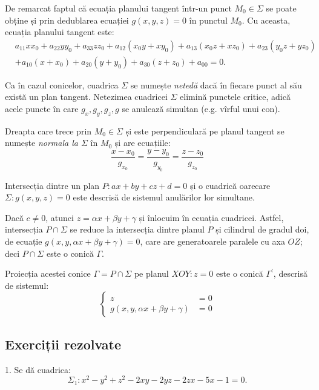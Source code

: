 \documentclass[11pt,a4paper]{article}
\theoremstyle{dotless}
\theoremstyle{dotlessdr}
\begin{document}
De remarcat faptul că ecuația planului tangent într-un punct $M_0 \in \Sigma$
se poate obține și prin dedublarea ecuației $g(x, y, z) = 0$ în punctul $M_0$.
Cu aceasta, ecuația planului tangent este:
\begin{align*}
	& a_{11} xx_0 + a_{22} yy_0 + a_{33}zz_0 + a_{12}(x_0y + xy_0) +
	    a_{13}(x_0z + xz_0) + a_{23}(y_0 z+ yz_0) \\
	&+ a_{10}(x + x_0) + a_{20}(y + y_0) + a_{30}(z + z_0) + a_{00} = 0.
\end{align*}

Ca în cazul conicelor, cuadrica $\Sigma$ se numește \emph{netedă} dacă în
fiecare punct al său există un plan tangent. Netezimea cuadricei $\Sigma$
elimină punctele critice, adică acele puncte în care $g_x, g_y, g_z, g$ se
anulează simultan (e.g. vîrful unui con).

Dreapta care trece prin $M_0 \in \Sigma$ și este perpendiculară pe planul
tangent se numește \emph{normala la $\Sigma$} în $M_0$ și are ecuațiile: 
 \[
	\dfrac{x - x_0}{g_{x_0}} = \dfrac{y - y_0}{g_{y_0}} =
	\dfrac{z - z_0}{g_{z_0}}
\]

Intersecția dintre un plan $P: ax + by + cz + d = 0$ și o cuadrică oarecare
$\Sigma: g(x, y, z) = 0$ este descrisă de sistemul anulărilor lor simultane.

Dacă $c \neq 0$, atunci $z = \alpha x + \beta y + \gamma$ și înlocuim în
ecuația cuadricei. Astfel, intersecția $P \cap \Sigma$ se reduce la intersecția
dintre planul $P$ și cilindrul de gradul doi, de ecuație
$g(x, y, \alpha x + \beta y + \gamma) = 0$, care are generatoarele paralele
cu axa $OZ$; deci $P \cap \Sigma$ este o conică $\Gamma$.

Proiecția acestei conice $\Gamma = P \cap \Sigma$ pe planul $XOY: z = 0$ este o 
conică $\Gamma^{\prime}$, descrisă de sistemul: 
 \[
	\begin{cases}	
	    z &= 0\\
	    g(x, y, \alpha x + \beta y + \gamma) &= 0
    \end{cases}
\]


\subsection{Exerciții rezolvate}

1. Se dă cuadrica: 
 \[
	\Sigma_1 : x^2 - y^2 + z^2 - 2xy - 2yz - 2zx - 5x - 1 = 0.
\]
\end{document}
